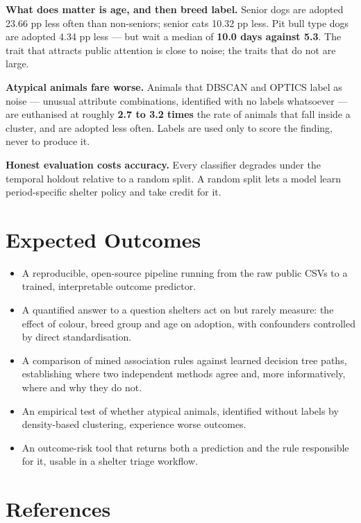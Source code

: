 \documentclass[11pt,a4paper]{article}
\begin{document}
\textbf{What does matter is age, and then breed label.} Senior dogs are adopted
23.66 pp less often than non-seniors; senior cats 10.32 pp less. Pit bull type dogs
are adopted 4.34 pp less --- but wait a median of \textbf{10.0 days against 5.3}.
The trait that attracts public attention is close to noise; the traits that do not
are large.

\textbf{Atypical animals fare worse.} Animals that DBSCAN and OPTICS label as noise
--- unusual attribute combinations, identified with no labels whatsoever --- are
euthanised at roughly \textbf{2.7 to 3.2 times} the rate of animals that fall inside
a cluster, and are adopted less often. Labels are used only to score the finding,
never to produce it.

\textbf{Honest evaluation costs accuracy.} Every classifier degrades under the
temporal holdout relative to a random split. A random split lets a model learn
period-specific shelter policy and take credit for it.

\section*{Expected Outcomes}

\begin{itemize}
  \item A reproducible, open-source pipeline running from the raw public CSVs to a
        trained, interpretable outcome predictor.
  \item A quantified answer to a question shelters act on but rarely measure: the
        effect of colour, breed group and age on adoption, with confounders
        controlled by direct standardisation.
  \item A comparison of mined association rules against learned decision tree paths,
        establishing where two independent methods agree and, more informatively,
        where and why they do not.
  \item An empirical test of whether atypical animals, identified without labels by
        density-based clustering, experience worse outcomes.
  \item An outcome-risk tool that returns both a prediction and the rule responsible
        for it, usable in a shelter triage workflow.
\end{itemize}

\section*{References}
\end{document}
